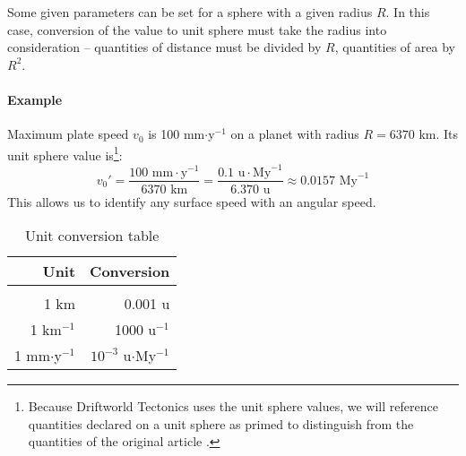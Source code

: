 Some given parameters can be set for a sphere with a given radius $R$. In this case, conversion of the value to unit sphere must take the radius into consideration -- quantities of distance must be divided by $R$, quantities of area by $R^2$.
\paragraph{Example}Maximum plate speed $v_0$ is 100 mm$\cdot$y$^{-1}$ on a planet with radius $R=6370$ km. Its unit sphere value is\footnote{Because Driftworld Tectonics uses the unit sphere values, we will reference quantities declared on a unit sphere as primed to distinguish from the quantities of the original article \cite{cortial}.}:
$$v_0' = \frac{100\mbox{ mm}\cdot\mbox{y}^{-1}}{6370\mbox{ km}}=\frac{0.1\mbox{ u}\cdot\mbox{My}^{-1}}{6.370\mbox{ u}}\approx 0.0157\mbox{ My}^{-1}$$
This allows us to identify any surface speed with an angular speed.
\begin{table}
\centering
\begin{tabular}{rr}
\textbf{Unit}&\textbf{Conversion}\\
\hline\\
1 km&0.001 u\\
1 km$^{-1}$&1000 u$^{-1}$\\
1 mm$\cdot$y$^{-1}$&$10^{-3}$ u$\cdot$My$^{-1}$
\end{tabular}
\caption{Unit conversion table}
\label{tab:unit-conversion}
\end{table}
